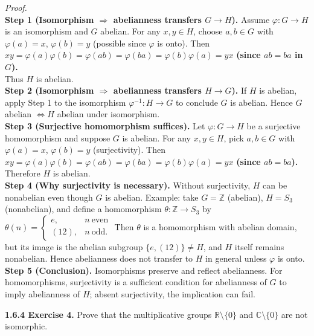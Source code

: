 \documentclass[12pt]{article}
\theoremstyle{definition}
\begin{document}
\emph{Proof.}\\
\textbf{Step 1 (Isomorphism $\Rightarrow$ abelianness transfers $G\to H$).} Assume $\varphi:G\to H$ is an isomorphism and $G$ abelian. For any $x,y\in H$, choose $a,b\in G$ with $\varphi(a)=x$, $\varphi(b)=y$ (possible since $\varphi$ is onto). Then\\
\quad $xy=\varphi(a)\varphi(b)=\varphi(ab)=\varphi(ba)=\varphi(b)\varphi(a)=yx$ \textbf{ (since $ab=ba$ in $G$).}\\
Thus $H$ is abelian.\\
\textbf{Step 2 (Isomorphism $\Rightarrow$ abelianness transfers $H\to G$).} If $H$ is abelian, apply Step 1 to the isomorphism $\varphi^{-1}:H\to G$ to conclude $G$ is abelian. Hence $G$ abelian $\Leftrightarrow H$ abelian under isomorphism.\\
\textbf{Step 3 (Surjective homomorphism suffices).} Let $\varphi:G\to H$ be a surjective homomorphism and suppose $G$ is abelian. For any $x,y\in H$, pick $a,b\in G$ with $\varphi(a)=x$, $\varphi(b)=y$ (surjectivity). Then\\
\quad $xy=\varphi(a)\varphi(b)=\varphi(ab)=\varphi(ba)=\varphi(b)\varphi(a)=yx$ \textbf{ (since $ab=ba$).}\\
Therefore $H$ is abelian.\\
\textbf{Step 4 (Why surjectivity is necessary).} Without surjectivity, $H$ can be nonabelian even though $G$ is abelian. Example: take $G=\mathbb{Z}$ (abelian), $H=S_3$ (nonabelian), and define a homomorphism $\theta:\mathbb{Z}\to S_3$ by $\theta(n)=\begin{cases}e,& n\ \text{even}\\ (12),& n\ \text{odd.}\end{cases}$ Then $\theta$ is a homomorphism with abelian domain, but its image is the abelian subgroup $\{e,(12)\}\neq H$, and $H$ itself remains nonabelian. Hence abelianness does not transfer to $H$ in general unless $\varphi$ is onto.\\
\textbf{Step 5 (Conclusion).} Isomorphisms preserve and reflect abelianness. For homomorphisms, surjectivity is a sufficient condition for abelianness of $G$ to imply abelianness of $H$; absent surjectivity, the implication can fail.

\newpage

\noindent \textbf{1.6.4 Exercise 4.} Prove that the multiplicative groups $\mathbb{R}\setminus\{0\}$ and $\mathbb{C}\setminus\{0\}$ are not isomorphic.\\ %
\end{document}
